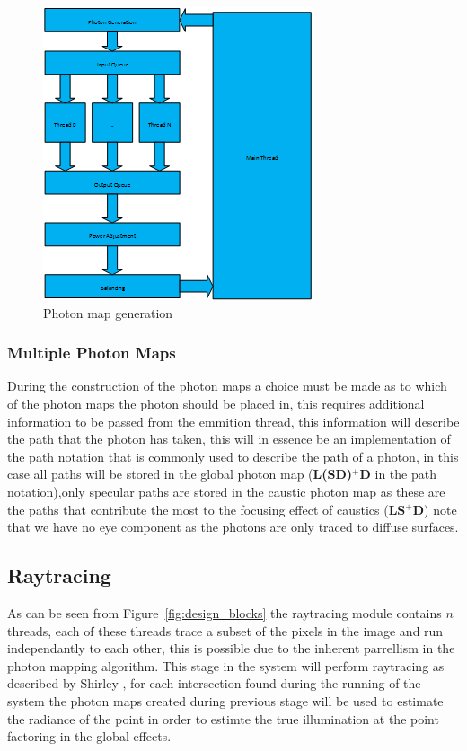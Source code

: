 \begin{figure}
\centering
\includegraphics{./images/photon_threading.png}
\caption{Photon map generation}
\label{fig:photon_generation}
\end{figure}

\subsubsection{Multiple Photon Maps}
During the construction of the photon maps a choice must be made as to which of the photon maps the photon
should be placed in, this requires additional information to be passed from the emmition thread, this information
will describe the path that the photon has taken, this will in essence be an implementation of the path notation
that is commonly used to describe the path of a photon, in this case all paths will be stored in the global photon
map (\textbf{L(S\textbar D)$^+$D} in the path notation),only specular paths are stored in the caustic photon map
as these are the paths that contribute the most to the focusing effect of caustics (\textbf{LS$^+$D}) note that
we have no eye component as the photons are only traced to diffuse surfaces.


\subsection{Raytracing}
As can be seen from Figure~\ref{fig:design_blocks} the raytracing module contains $n$ threads, each of these
threads trace a subset of the pixels in the image and run independantly to each other, this is possible due
to the inherent parrellism in the photon mapping algorithm. This stage in the system will perform raytracing
as described by Shirley \cite{shirley-dist}, for each intersection found during the running of the system the photon
maps created during previous stage will be used to estimate the radiance of the point in order to estimte the
true illumination at the point factoring in the global effects.

